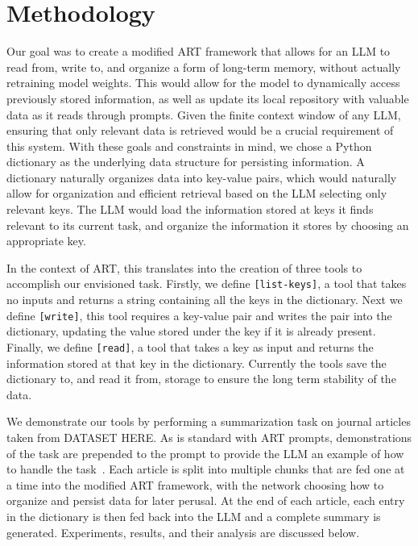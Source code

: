 \documentclass{article}
\begin{document}
\section{Methodology}

Our goal was to create a modified ART framework that allows for an LLM to read from, write to, and organize a form of long-term memory, without actually retraining model weights.
This would allow for the model to dynamically access previously stored information, as well as update its local repository with valuable data as it reads through prompts.
Given the finite context window of any LLM, ensuring that only relevant data is retrieved would be a crucial requirement of this system.
With these goals and constraints in mind, we chose a Python dictionary as the underlying data structure for persisting information.
A dictionary naturally organizes data into key-value pairs, which would naturally allow for organization and efficient retrieval based on the LLM selecting only relevant keys.
The LLM would load the information stored at keys it finds relevant to its current task, and organize the information it stores by choosing an appropriate key.

In the context of ART, this translates into the creation of three tools to accomplish our envisioned task. Firstly, we define \texttt{[list-keys]}, a tool that takes no inputs and returns a string containing all the keys in the dictionary.
Next we define \texttt{[write]}, this tool requires a key-value pair and writes the pair into the dictionary, updating the value stored under the key if it is already present.
Finally, we define \texttt{[read]}, a tool that takes a key as input and returns the information stored at that key in the dictionary.
Currently the tools save the dictionary to, and read it from, storage to ensure the long term stability of the data.

We demonstrate our tools by performing a summarization task on journal articles taken from DATASET HERE.
As is standard with ART prompts, demonstrations of the task are prepended to the prompt to provide the LLM an example of how to handle the task~\cite{paranjape2023art}.
Each article is split into multiple chunks that are fed one at a time into the modified ART framework, with the network choosing how to organize and persist data for later perusal.
At the end of each article, each entry in the dictionary is then fed back into the LLM and a complete summary is generated. Experiments, results, and their analysis are discussed below.
\end{document}
